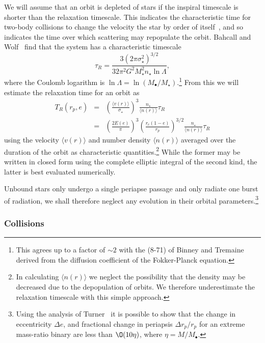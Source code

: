 \documentclass[useAMS,usenatbib]{mn2e}
\begin{document}
We will assume that an orbit is depleted of stars if the inspiral timescale is shorter than the relaxation timescale. This indicates the characteristic time for two-body collisions to change the velocity the star by order of itself~\cite{Binney1987}, and so indicates the time over which scattering may repopulate the orbit. Bahcall and Wolf~\cite{Bahcall1977} find that the system has a characteristic timescale
\begin{equation}
\tau_R = \frac{3(2\pi\sigma_\star^2)^{3/2}}{32\pi^2G^2M_\star^2n_\star\ln\Lambda},
\end{equation}
where the Coulomb logarithm is $\ln\Lambda = \ln(M_\bullet/M_\star)$.\footnote{This agrees up to a factor of $\sim2$ with the (8-71) of Binney and Tremaine~\cite{Binney1987} derived from the diffusion coefficient of the Fokker-Planck equation.} From this we will estimate the relaxation time for an orbit as
\begin{eqnarray}
T_R(r_p,e) & = & \left(\frac{\langle v(r)\rangle}{\sigma_\star}\right)^3\frac{n_\star}{\langle n(r)\rangle}\tau_R\\
 & = & \left(\frac{2 E(e)}{\pi}\right)^3\left(\frac{r_c(1 - e)}{r_p}\right)^{3/2}\frac{n_\star}{\langle n(r)\rangle}\tau_R
\end{eqnarray}
using the velocity $\langle v(r)\rangle$ and number density $\langle n(r)\rangle$ averaged over the duration of the orbit as characteristic quantities.\footnote{In calculating $\langle n(r)\rangle$ we neglect the possibility that the density may be decreased due to the depopulation of orbits. We therefore underestimate the relaxation timescale with this simple approach.} While the former may be written in closed form using the complete elliptic integral of the second kind, the latter is best evaluated numerically.

Unbound stars only undergo a single periapse passage and only radiate one burst of radiation, we shall therefore neglect any evolution in their orbital parameters.\footnote{Using the analysis of Turner~\cite{Turner1977} it is possible to show that the change in eccentricity $\Delta e$, and fractional change in periapsis $\Delta r_p / r_p$ for an extreme mass-ratio binary are less than $\O(10\eta)$, where $\eta = M/M_\bullet$.}

\subsubsection{Collisions}
\end{document}
